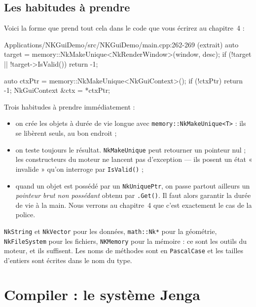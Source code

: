 \subsection{Les habitudes à prendre}

Voici la forme que prend tout cela dans le code que vous écrirez au chapitre~4 :

\begin{nkcode}{Applications/NKGuiDemo/src/NKGuiDemo/main.cpp:262-269 (extrait)}
auto target = memory::NkMakeUnique<NkRenderWindow>(window, desc);
if (!target || !target->IsValid())
    return -1;

auto ctxPtr = memory::NkMakeUnique<NkGuiContext>();
if (!ctxPtr)
    return -1;
NkGuiContext &ctx = *ctxPtr;
\end{nkcode}

Trois habitudes à prendre immédiatement :

\begin{itemize}
  \item on crée les objets à durée de vie longue avec
        \texttt{memory::NkMakeUnique<T>} : ils se libèrent seuls, au bon
        endroit ;
  \item on teste toujours le résultat. \texttt{NkMakeUnique} peut retourner un
        pointeur nul ; les constructeurs du moteur ne lancent pas d'exception —
        ils posent un état « invalide » qu'on interroge par \texttt{IsValid()} ;
  \item quand un objet est possédé par un \texttt{NkUniquePtr}, on passe partout
        ailleurs un \emph{pointeur brut non possédant} obtenu par
        \texttt{.Get()}. Il faut alors garantir la durée de vie à la main.
        Nous verrons au chapitre~4 que c'est exactement le cas de la police.
\end{itemize}

\begin{nkretenir}
\texttt{NkString} et \texttt{NkVector} pour les données, \texttt{math::Nk*} pour
la géométrie, \texttt{NkFileSystem} pour les fichiers, \texttt{NKMemory} pour la
mémoire : ce sont les outils du moteur, et ils suffisent. Les noms de méthodes
sont en \texttt{PascalCase} et les tailles d'entiers sont écrites dans le nom du
type.
\end{nkretenir}

\section{Compiler : le système Jenga}


